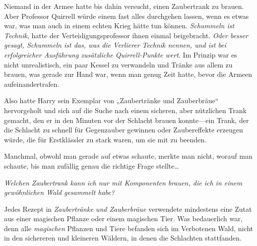 Niemand in der Armee hatte bis dahin versucht, einen Zaubertrank zu brauen. Aber Professor Quirrell würde einem fast alles durchgehen lassen, wenn es etwas war, was man auch in einem echten Krieg hätte tun können. \emph{Schummeln ist Technik}, hatte der Verteidigungsprofessor ihnen einmal beigebracht. \emph{Oder besser gesagt, Schummeln ist das, was die Verlierer Technik nennen, und ist bei erfolgreicher Ausführung zusätzliche Quirrell-Punkte wert}. Im Prinzip war es nicht unrealistisch, ein paar Kessel zu verwandeln und Tränke aus allem zu brauen, was gerade zur Hand war, wenn man genug Zeit hatte, bevor die Armeen aufeinandertrafen.

Also hatte Harry sein Exemplar von „Zaubertränke und Zauberbräue“ hervorgeholt und sich auf die Suche nach einem sicheren, aber nützlichen Trank gemacht, den er in den Minuten vor der Schlacht brauen konnte—ein Trank, der die Schlacht zu schnell für Gegenzauber gewinnen oder Zaubereffekte erzeugen würde, die für Erstklässler zu stark waren, um sie mit  zu beenden.

Manchmal, obwohl man gerade auf etwas schaute, merkte man nicht, worauf man schaute, bis man zufällig genau die richtige Frage stellte…

\emph{Welchen Zaubertrank kann ich nur mit Komponenten brauen, die ich in einem gewöhnlichen Wald gesammelt habe?}

Jedes Rezept in \emph{Zaubertränke und Zauberbräue} verwendete mindestens eine Zutat aus einer magischen Pflanze oder einem magischen Tier. Was bedauerlich war, denn alle \emph{magischen} Pflanzen und Tiere befanden sich im Verbotenen Wald, nicht in den sichereren und kleineren Wäldern, in denen die Schlachten stattfanden.

